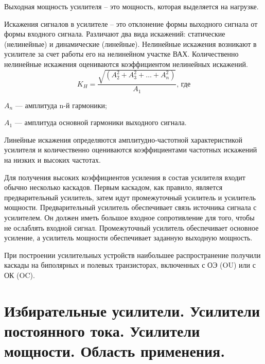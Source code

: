 \documentclass[unicode, 12pt, a4paper, oneside]{article}
\begin{document}
Выходная мощность усилителя – это мощность, которая выделяется на нагрузке.

Искажения сигналов в усилителе – это отклонение формы выходного сигнала от формы входного сигнала. Различают два вида искажений: статические (нелинейные) и динамические (линейные). Нелинейные искажения возникают в усилителе за счет работы его на нелинейном участке ВАХ. Количественно нелинейные искажения оцениваются коэффициентом нелинейных искажений.
\begin{equation}
K_{H} = \dfrac{\sqrt{(A_{2}^{2} + A_{3}^{2} + \ldots + A_{n}^{2})} }{A_{1}}\text{, где}
\end{equation}
\par $A_{n}$ --- амплитуда n-й гармоники;
\par $A_{1}$ --- амплитуда основной гармоники выходного сигнала.

Линейные искажения определяются амплитудно-частотной характеристикой усилителя и количественно оцениваются коэффициентами частотных искажений на низких и высоких частотах.

Для получения высоких коэффициентов усиления в состав усилителя входит обычно несколько каскадов. Первым каскадом, как правило, является предварительный усилитель, затем идут промежуточный усилитель и усилитель мощности. Предварительный усилитель обеспечивает связь источника сигнала с усилителем. Он должен иметь большое входное сопротивление для того, чтобы не ослаблять входной сигнал. Промежуточный усилитель обеспечивает основное усиление, а усилитель мощности обеспечивает заданную выходную мощность.

При построении усилительных устройств наибольшее распространение получили каскады на биполярных и полевых транзисторах, включенных с ОЭ (OU) или с ОК (OC).

\section{Избирательные усилители. Усилители постоянного тока. Усилители мощности. Область применения.}
\end{document}
